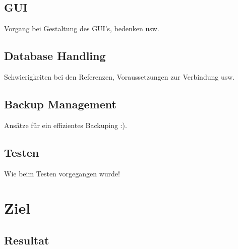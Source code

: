 \documentclass{article}
\begin{document}
\subsection{GUI}
Vorgang bei Gestaltung des GUI's, bedenken usw.

\subsection{Database Handling}
Schwierigkeiten bei den Referenzen, Voraussetzungen zur Verbindung usw.

\subsection{Backup Management}
Ansätze für ein effizientes Backuping :).

\subsection{Testen}
Wie beim Testen vorgegangen wurde!

\newpage

\section{Ziel}
\subsection{Resultat}
\end{document}

